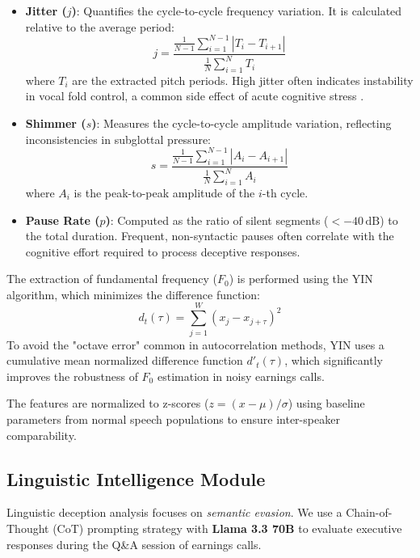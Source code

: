 \documentclass[conference]{IEEEtran}
\begin{document}
\begin{itemize}
 \item \textbf{Jitter ($j$)}: Quantifies the cycle-to-cycle frequency variation. It is calculated relative to the average period:
 \begin{equation}
     j = \frac{\frac{1}{N-1} \sum_{i=1}^{N-1} |T_i - T_{i+1}|}{\frac{1}{N} \sum_{i=1}^{N} T_i}
 \end{equation}
 where $T_i$ are the extracted pitch periods. High jitter often indicates instability in vocal fold control, a common side effect of acute cognitive stress \cite{kirchhubel2013}.

 \item \textbf{Shimmer ($s$)}: Measures the cycle-to-cycle amplitude variation, reflecting inconsistencies in subglottal pressure:
 \begin{equation}
     s = \frac{\frac{1}{N-1} \sum_{i=1}^{N-1} |A_i - A_{i+1}|}{\frac{1}{N} \sum_{i=1}^{N} A_i}
 \end{equation}
 where $A_i$ is the peak-to-peak amplitude of the $i$-th cycle.

 \item \textbf{Pause Rate ($p$)}: Computed as the ratio of silent segments ($< -40\,\mathrm{dB}$) to the total duration. Frequent, non-syntactic pauses often correlate with the cognitive effort required to process deceptive responses.
\end{itemize}

The extraction of fundamental frequency ($F_0$) is performed using the YIN algorithm, which minimizes the difference function:
\begin{equation}
    d_t(\tau) = \sum_{j=1}^W (x_j - x_{j+\tau})^2
\end{equation}
To avoid the "octave error" common in autocorrelation methods, YIN uses a cumulative mean normalized difference function $d'_t(\tau)$, which significantly improves the robustness of $F_0$ estimation in noisy earnings calls.

The features are normalized to z-scores ($z = (x - \mu) / \sigma$) using baseline parameters from normal speech populations to ensure inter-speaker comparability.

\subsection{Linguistic Intelligence Module}

Linguistic deception analysis focuses on \emph{semantic evasion}. We use a Chain-of-Thought (CoT) prompting strategy with \textbf{Llama 3.3 70B} to evaluate executive responses during the Q\&A session of earnings calls.
\end{document}
